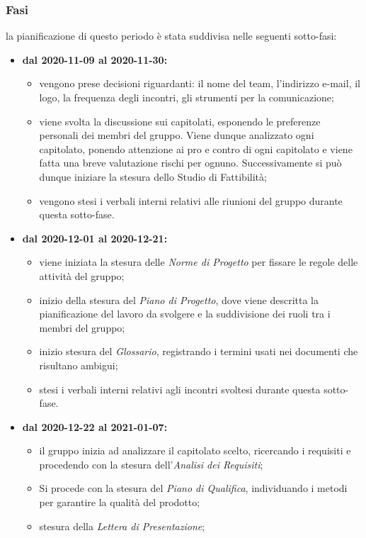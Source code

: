 \subsubsection{Fasi}
la pianificazione di questo periodo è stata suddivisa nelle seguenti sotto-fasi:
\begin{itemize}
	\item \textbf{dal 2020-11-09 al 2020-11-30:}
	\begin{itemize}
	\item vengono prese decisioni riguardanti: il nome del team, l'indirizzo e-mail, il logo, la frequenza degli incontri, gli strumenti per la comunicazione;
	\item viene svolta la discussione sui capitolati, esponendo le preferenze personali dei membri del gruppo. Viene dunque analizzato ogni capitolato, ponendo attenzione ai pro e contro di ogni capitolato e viene fatta una breve valutazione rischi per ognuno. Successivamente si può dunque iniziare la stesura dello Studio di Fattibilità;
	\item vengono stesi i verbali interni relativi alle riunioni del gruppo durante questa sotto-fase.
	\end{itemize}
	\item \textbf{dal 2020-12-01 al 2020-12-21:}
	\begin{itemize}
		\item viene iniziata la stesura delle \textit{Norme di Progetto} per fissare le regole delle attività del gruppo;
		\item inizio della stesura del \textit{Piano di Progetto}, dove viene descritta la pianificazione del lavoro da svolgere e la suddivisione dei ruoli tra i membri del gruppo;
		\item inizio stesura del \textit{Glossario}, registrando i termini usati nei documenti che risultano ambigui;
		\item stesi i verbali interni relativi agli incontri svoltesi durante questa sotto-fase.
	\end{itemize}
	\item \textbf{dal 2020-12-22 al 2021-01-07:}
	\begin{itemize}
		\item il gruppo inizia ad analizzare il capitolato scelto, ricercando i requisiti e procedendo con la stesura dell'\textit{Analisi dei Requisiti};
		\item Si procede con la stesura del \textit{Piano di Qualifica}, individuando i metodi per garantire la qualità del prodotto;
		\item stesura della \textit{Lettera di Presentazione};

\end{itemize}
\end{itemize}
